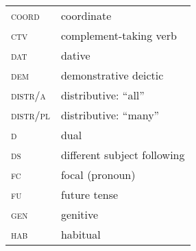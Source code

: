 \begin{multicols}{2}
\begin{tabular}{lp{4.5cm}}
\textsc{coord}              &                coordinate \\
\textsc{ctv}                  &            complement-taking verb \\
\textsc{dat}                    &          dative \\
\textsc{dem}        &                      demonstrative deictic \\
\textsc{distr/a}      &                        distributive: ``all'' \\
\textsc{distr/pl}       &                       distributive: ``many'' \\
\textsc{d}                &              dual \\
\textsc{ds}                 &             different subject following \\
\textsc{fc}                   &           focal (pronoun) \\
\textsc{fu}      &                        future tense \\
\textsc{gen}       &                       genitive \\
\textsc{hab}         &                     habitual \\
\end{tabular}


\end{multicols}
